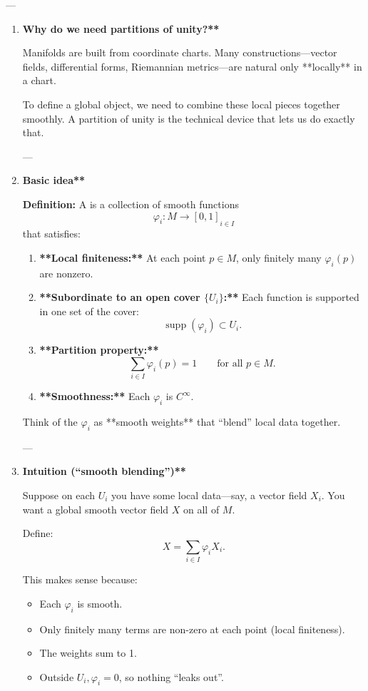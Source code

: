 \documentclass[10pt,a4paper]{report}
\begin{document}
---
\begin{enumerate}


\item \textbf{Why do we need partitions of unity?**}

Manifolds are built from coordinate charts. Many constructions—vector fields, differential forms, Riemannian metrics—are natural only **locally** in a chart.

To define a global object, we need to combine these local pieces together smoothly.
A partition of unity is the technical device that lets us do exactly that.

---

\item  \textbf{Basic idea**}

\textbf{Definition:} A  is a collection of smooth functions
$$
{\varphi_i : M \to [0,1]}_{i\in I}
$$
that satisfies:
\begin{enumerate}

\item \textbf{**Local finiteness:**}
   At each point $p\in M$, only finitely many $\varphi_i(p)$ are nonzero.

\item \textbf{**Subordinate to an open cover $\{U_i\}$:**}
   Each function is supported in one set of the cover:
   $$
   \operatorname{supp}(\varphi_i) \subset U_i.
   $$

\item  \textbf{**Partition property:**}
   $$
   \sum_{i\in I} \varphi_i(p) = 1 \qquad \text{for all } p\in M.
   $$

\item \textbf{**Smoothness:**}
   Each $\varphi_i$ is $C^\infty$.

\end{enumerate}
Think of the $\varphi_i$ as **smooth weights** that “blend” local data together.

---

\item \textbf{Intuition (“smooth blending”)**}

Suppose on each $U_i$ you have some local data—say, a vector field $X_i$.
You want a global smooth vector field $X$ on all of $M$.

Define:
$$
X = \sum_{i\in I} \varphi_i X_i.
$$

This makes sense because:
\begin{itemize}

\item  Each $\varphi_i$ is smooth.
\item Only finitely many terms are non-zero at each point (local finiteness).
\item  The weights sum to 1.
\item  Outside $U_i, \varphi_i = 0$, so nothing “leaks out”.


\end{itemize}
\end{enumerate}
\end{document}
